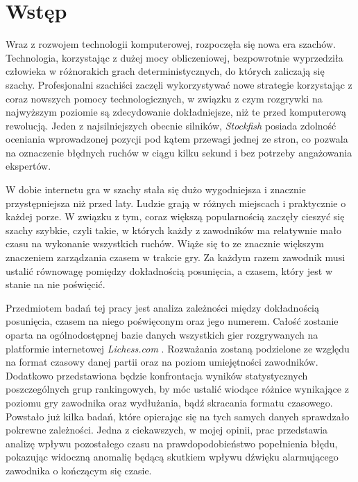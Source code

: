 \documentclass[inzynierska]{pwr_wmat_praca_dyplomowa}
\theoremstyle{plain}
\numberwithin{theorem}{chapter}
\theoremstyle{definition}
\numberwithin{theorem}{chapter}
\begin{document}

\frontmatter
\maketitle
\mainmatter
\tableofcontents

{\backmatter \chapter{Wstęp}}



\hspace{17.5pt}Wraz z rozwojem technologii komputerowej, rozpoczęła się nowa era szachów. Technologia, korzystając z dużej mocy obliczeniowej, bezpowrotnie wyprzedziła człowieka w różnorakich grach deterministycznych, do których zaliczają się szachy. Profesjonalni szachiści zaczęli wykorzystywać nowe strategie korzystając z coraz nowszych pomocy technologicznych, w związku z czym rozgrywki na najwyższym poziomie są zdecydowanie dokładniejsze, niż te przed komputerową rewolucją. Jeden z najsilniejszych obecnie silników,\textit{ Stockfish} \cite{stockfish} posiada zdolność oceniania wprowadzonej pozycji pod kątem przewagi jednej ze stron, co pozwala na oznaczenie błędnych ruchów w ciągu kilku sekund i bez potrzeby angażowania ekspertów.


W dobie internetu gra w szachy stała się dużo wygodniejsza i znacznie przystępniejsza niż przed laty. Ludzie grają w różnych miejscach i praktycznie o każdej porze. W związku z tym, coraz większą popularnością zaczęły cieszyć się szachy szybkie, czyli takie, w których każdy z zawodników ma relatywnie mało czasu na wykonanie wszystkich ruchów. Wiąże się to ze znacznie większym znaczeniem zarządzania czasem w trakcie gry. Za każdym razem zawodnik musi ustalić równowagę pomiędzy dokładnością posunięcia, a czasem, który jest w stanie na nie poświęcić. 


Przedmiotem badań tej pracy jest analiza zależności między dokładnością posunięcia, czasem na niego poświęconym oraz jego numerem. Całość zostanie oparta na ogólnodostępnej bazie danych wszystkich gier rozgrywanych na platformie internetowej \textit{Lichess.com} \cite{lichess}. Rozważania zostaną podzielone ze względu na format czasowy danej partii oraz na poziom umiejętności zawodników. Dodatkowo przedstawiona będzie konfrontacja wyników statystycznych poszczególnych grup rankingowych, by móc ustalić wiodące różnice wynikające z poziomu gry zawodnika oraz wydłużania, bądź skracania formatu czasowego. Powstało już kilka badań, które opierając się na tych samych danych sprawdzało pokrewne zależności. Jedna z ciekawszych, w mojej opinii, prac \cite{praca_1} przedstawia analizę wpływu pozostałego czasu na prawdopodobieństwo popełnienia błędu, pokazując widoczną anomalię będącą skutkiem wpływu dźwięku alarmującego zawodnika o kończącym się czasie.
\end{document}
